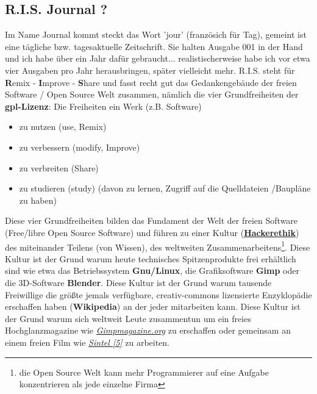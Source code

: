 \subsection*{R.I.S. Journal ?}
Im Name Journal kommt steckt das Wort 'jour' (französich für Tag), gemeint ist eine tägliche bzw. tagesaktuelle Zeitschrift. Sie halten Ausgabe 001 in der Hand und ich habe über ein Jahr dafür gebraucht... realistischerweise habe ich vor etwa vier Ausgaben pro Jahr herausbringen, später vielleicht mehr. R.I.S. steht für \textbf{R}emix - \textbf{I}mprove - \textbf{S}hare und fasst recht gut das Gedankengebäude der freien Software / Open Source Welt zusammen, nämlich die vier Grundfreiheiten der \textbf{gpl-Lizenz}: Die Freiheiten ein Werk (z.B. Software) 
\begin{itemize}
\item zu nutzen (use, Remix)
\item zu verbessern (modify, Improve)
\item zu verbreiten (Share)
\item zu studieren (study) (davon zu lernen, Zugriff auf die Quelldateien /Baupläne zu haben)
\end{itemize}

Diese vier Grundfreiheiten bilden das Fundament der Welt der freien Software (Free/libre Open Source Software) und führen zu einer Kultur (\href{http://en.wikipedia.org/wiki/Hacker_ethic}{\textbf{Hackerethik}}) des miteinander Teilens (von Wissen), des weltweiten Zusammenarbeitens\footnote{die Open Source Welt kann mehr Programmierer auf eine Aufgabe konzentrieren als jede einzelne Firma}. Diese Kultur ist der Grund warum heute technisches Spitzenprodukte frei erhältlich sind wie etwa das Betriebssystem \textbf{Gnu/Linux}, die Grafiksoftware \textbf{Gimp} oder die 3D-Software \textbf{Blender}. Diese Kultur ist der Grund warum tausende Freiwillige die größte jemals verfügbare, creativ-commons lizensierte Enzyklopädie erschaffen haben (\textbf{Wikipedia}) an der jeder mitarbeiten kann. Diese Kultur ist der Grund warum sich weltweit Leute zusammentun um ein freies Hochglanzmagazine wie \href{http://gimpmagazine.org/}{\textit{Gimpmagazine.org}} zu erschaffen oder gemeinsam an einem freien Film wie \href{http://www.sintel.org/}{\textit{Sintel [5]}} zu arbeiten. \\

